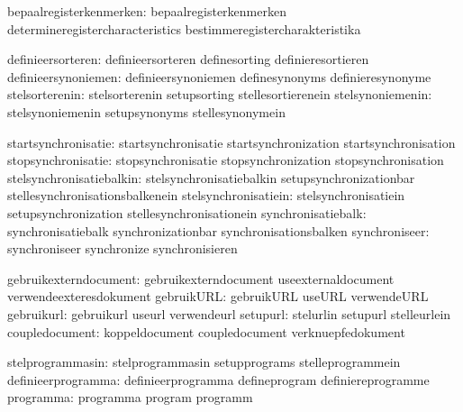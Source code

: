       bepaalregisterkenmerken:  bepaalregisterkenmerken      determineregistercharacteristics
                                bestimmeregistercharakteristika

            definieersorteren:  definieersorteren            definesorting
                                definieresortieren
          definieersynoniemen:  definieersynoniemen          definesynonyms
                                definieresynonyme
               stelsorterenin:  stelsorterenin               setupsorting
                                stellesortierenein
             stelsynoniemenin:  stelsynoniemenin             setupsynonyms
                                stellesynonymein

          startsynchronisatie:  startsynchronisatie          startsynchronization
                                startsynchronisation
           stopsynchronisatie:  stopsynchronisatie           stopsynchronization
                                stopsynchronisation
     stelsynchronisatiebalkin:  stelsynchronisatiebalkin     setupsynchronizationbar
                                stellesynchronisationsbalkenein
         stelsynchronisatiein:  stelsynchronisatiein         setupsynchronization
                                stellesynchronisationein
           synchronisatiebalk:  synchronisatiebalk           synchronizationbar
                                synchronisationsbalken
                synchroniseer:  synchroniseer                synchronize
                                synchronisieren

        gebruikexterndocument:  gebruikexterndocument        useexternaldocument
                                verwendeexteresdokument
                   gebruikURL:  gebruikURL                   useURL
                                verwendeURL
                   gebruikurl:  gebruikurl                   useurl
                                verwendeurl
                     setupurl:  stelurlin                    setupurl
                                stelleurlein
               coupledocument:  koppeldocument               coupledocument
                                verknuepfedokument

             stelprogrammasin:  stelprogrammasin             setupprograms
                                stelleprogrammein
           definieerprogramma:  definieerprogramma           defineprogram
                                definiereprogramme
                    programma:  programma                    program
                                programm


